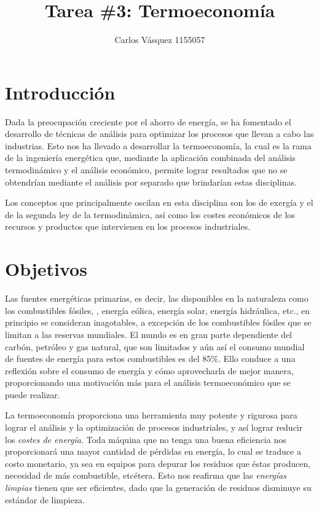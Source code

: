 \documentclass[12pt, letterpaper]{article}
\title{Tarea \#3: Termoeconomía}
\author{Carlos Vásquez 1155057}
\begin{document}
\maketitle
\section*{Introducción}

Dada la preocupación creciente por el ahorro de energía, se ha fomentado el desarrollo de técnicas de análisis para optimizar los procesos que llevan a cabo las industrias. Esto nos ha llevado a desarrollar la termoeconomía, la cual es la rama de la ingeniería energética que, mediante la aplicación combinada del análisis termodinámico y el análisis económico, permite lograr resultados que no se obtendrían mediante el análisis por separado que brindarían estas disciplinas. \autocite{montes09}

Los conceptos que principalmente oscilan en esta disciplina son los de exergía y el de la segunda ley de la termodinámica, así como los costes económicos de los recursos y productos que intervienen en los procesos industriales. 

\section*{Objetivos}

Las fuentes energéticas primarias, es decir, las disponibles en la naturaleza como los combustibles fósiles, , energía eólica, energía solar, energía hidráulica, etc., en principio se consideran inagotables, a excepción de los combustibles fósiles que se limitan a las reservas mundiales. El mundo es en gran parte dependiente del carbón, petróleo y gas natural, que son limitados y aún así el consumo mundial de fuentes de energía para estos combustibles es del 85\%. Ello conduce a una reflexión sobre el consumo de energía y cómo aprovecharla de mejor manera, proporcionando una motivación más para el análisis termoeconómico que se puede realizar.\autocite{silva15}

La termoeconomía proporciona una herramienta muy potente y rigurosa para lograr el análisis y la optimización de procesos industriales, y así lograr reducir los \textit{costes de energía}. Toda máquina que no tenga una buena eficiencia nos proporcionará una mayor cantidad de pérdidas en energía, lo cual se traduce a costo monetario, ya sea en equipos para depurar los residuos que éstas producen, necesidad de más combustible, etcétera. Esto nos reafirma que las \textit{energías limpias} tienen que ser eficientes, dado que la generación de residuos disminuye su estándar de limpieza.
\end{document}

